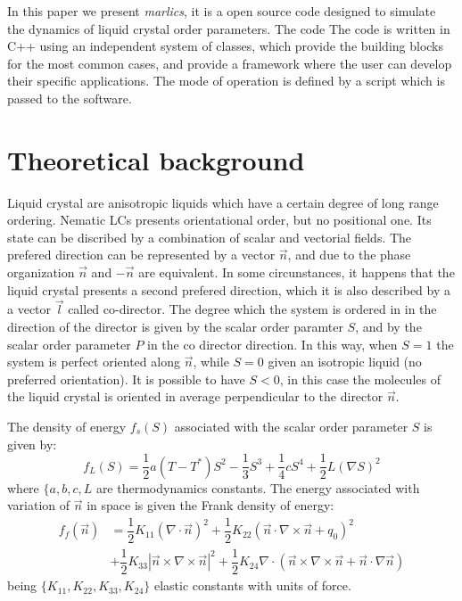 \documentclass[final,5p,times,twocolumn]{elsarticle}
\newcounter{bla}
\begin{document}
In this paper we present \textit{marlics}, it is a open source code
designed to simulate the dynamics of liquid crystal order
parameters. The code The code is written in C++ using an independent
system of classes, which provide the building blocks for the most
common cases, and provide a framework where the user can develop their
specific applications. The mode of operation is defined by a script
which is passed to the software.

\section{Theoretical background}

Liquid crystal are anisotropic liquids which have a certain degree of
long range ordering. Nematic LCs presents orientational order, but no
positional one. Its state can be discribed by a combination of scalar
and vectorial fields.  The prefered direction can be represented by a
vector $\vec{n}$, and due to the phase organization $\vec{n}$ and
$-\vec{n}$ are equivalent. In some circunstances, it happens that the
liquid crystal presents a second prefered direction, which it is also
described by a a vector $\vec{l}$ called co-director. The degree which
the system is ordered in in the direction of the director is given by
the scalar order paramter $S$, and by the scalar order parameter $P$
in the co director direction. In this way, when $S=1$ the system is
perfect oriented along $\vec{n}$, while $S=0$ given an isotropic
liquid (no preferred orientation). It is possible to have $S <0$, in
this case the molecules of the liquid crystal is oriented in average
perpendicular to the director $\vec{n}$. 

The density of energy $f_s(S)$ associated with the scalar order
parameter $S$ is given by:
\begin{equation}
  f_L(S)=\dfrac{1}{2} a \left(T-T^* \right) S^2- \dfrac{1}{3} S^3+\dfrac{1}{4} c S^4 +\dfrac{1}{2} L (\nabla S)^2
\end{equation}
where $\lbrace{a,b,c,L}$ are thermodynamics constants. The energy
associated with variation of $\vec{n}$ in space is given the Frank
density of energy:
\begin{align} \label{eq:frank_energy}\nonumber
  f_f(\vec{n})&=\dfrac{1}{2} K_{11} (\nabla \cdot  \vec{n})^2 + \dfrac{1}{2} K_{22} (\vec{n} \cdot \nabla \times \vec{n}+q_0)^2\\
 & +\dfrac{1}{2} K_{33} \left| \vec{n} \times \nabla \times \vec{n} \right|^2 
  +\dfrac{1}{2} K_{24}  \nabla \cdot \left(\vec{n} \times \nabla \times  \vec{n} +\vec{n} \cdot \nabla \vec{n} \right)
\end{align}
being $\lbrace K_{11}, K_{22}, K_{33},K_{24} \rbrace$ elastic
constants with units of force.
\end{document}
